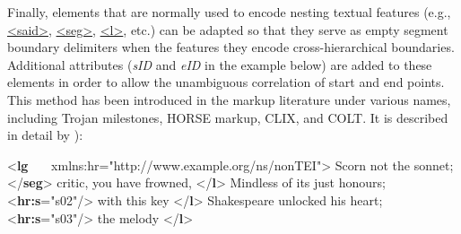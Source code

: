 Finally, elements that are normally used to encode nesting textual features (e.g., \hyperref[TEI.said]{<said>}, \hyperref[TEI.seg]{<seg>}, \hyperref[TEI.l]{<l>}, etc.) can be adapted so that they serve as empty segment boundary delimiters when the features they encode cross-hierarchical boundaries. Additional attributes ({\itshape sID} and {\itshape eID} in the example below) are added to these elements in order to allow the unambiguous correlation of start and end points. This method has been introduced in the markup literature under various names, including Trojan milestones, HORSE markup, CLIX, and COLT. It is described in detail by \cite{NH-BIBL-1}): \par\bgroup{}\exampleFont \begin{shaded}\noindent\mbox{}{<\textbf{lg}\mbox{}\newline 
   xmlns:hr="http://www.example.org/ns/nonTEI">}\mbox{}\newline 
{}\mbox{}\newline 
\hspace*{1em}Scorn not the sonnet;{</\textbf{seg}>}\mbox{}\newline 
\hspace*{1em}critic, you have frowned, {</\textbf{l}>}\mbox{}\newline 
{}Mindless of its just honours; {<\textbf{hr:s}\hspace*{1em}{eID}="{s02}"/>}\mbox{}\newline 
\hspace*{1em}with this key {</\textbf{l}>}\mbox{}\newline 
{}Shakespeare unlocked his heart; {<\textbf{hr:s}\hspace*{1em}{eID}="{s03}"/>}\mbox{}\newline 
\hspace*{1em}the melody {</\textbf{l}>}\mbox{}\newline 

\end{shaded}

